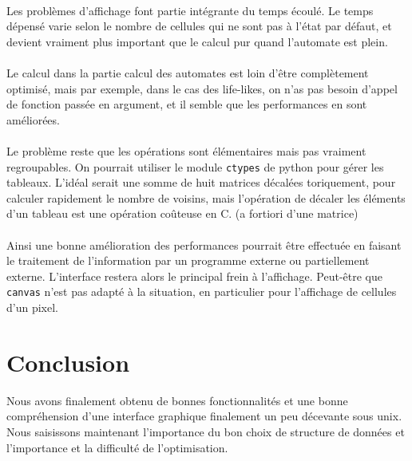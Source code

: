 \documentclass[a4paper]{article}
\begin{document}
\paragraph{} Les problèmes d'affichage font partie intégrante du temps écoulé. Le temps dépensé varie selon le nombre de cellules qui ne sont pas à l'état par défaut, et devient vraiment plus important que le calcul pur quand l'automate est plein.

\paragraph{} Le calcul dans la partie calcul des automates est loin d'être complètement optimisé, mais par exemple, dans le cas des life-likes, on n'as pas besoin d'appel de fonction passée en argument, et il semble que les performances en sont améliorées.

\paragraph{} Le problème reste que les opérations sont élémentaires mais pas vraiment regroupables. On pourrait utiliser le module {\tt ctypes} de python pour gérer les tableaux. L'idéal serait une somme de huit matrices décalées toriquement, pour calculer rapidement le nombre de voisins, mais l'opération de décaler les éléments d'un tableau est une opération coûteuse en C. (a fortiori d'une matrice)

\paragraph{} Ainsi une bonne amélioration des performances pourrait être effectuée en faisant le traitement de l'information par un programme externe ou partiellement externe. L'interface restera alors le principal frein à l'affichage. Peut-être que {\tt canvas} n'est pas adapté à la situation, en particulier pour l'affichage de cellules d'un pixel.

\section*{Conclusion}

Nous avons finalement obtenu de bonnes fonctionnalités et une bonne compréhension d'une interface graphique finalement un peu décevante sous unix. Nous saisissons maintenant l'importance du bon choix de structure de données et l'importance et la difficulté de l'optimisation.
\end{document}
